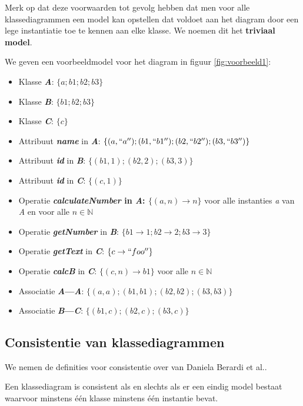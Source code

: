 Merk op dat deze voorwaarden tot gevolg hebben dat men voor alle klassediagrammen een model kan opstellen dat voldoet aan het diagram door een lege instantiatie toe te kennen aan elke klasse. We noemen dit het \textbf{triviaal model}.

We geven een voorbeeldmodel voor het diagram in figuur \ref{fig:voorbeeld1}:

\begin{itemize}
	\item Klasse \textbf{\textit{A}}: $\{a; b1; b2; b3\}$
	\item Klasse \textbf{\textit{B}}: $\{b1; b2; b3\}$
	\item Klasse \textbf{\textit{C}}: $\{c\}$
	\item Attribuut \textbf{\textit{name}} in \textbf{\textit{A}}: $\{(a,``a''); (b1,``b1''); (b2,``b2''); (b3,``b3'')\}$
	\item Attribuut \textbf{\textit{id}} in \textbf{\textit{B}}: $\{(b1,1);(b2,2);(b3,3)\}$
	\item Attribuut \textbf{\textit{id}} in \textbf{\textit{C}}: $\{(c,1)\}$
	\item Operatie \textbf{\textit{calculateNumber} in \textbf{\textit{A}}: $\{(a,n)\rightarrow{}n\}$} voor alle instanties \textit{a} van \textit{A} en voor alle $n \in \mathbb{N}$
	\item Operatie \textbf{\textit{getNumber}} in \textbf{\textit{B}}: $\{b1\rightarrow{}1; b2\rightarrow{}2; b3\rightarrow{}3\}$
	\item Operatie \textbf{\textit{getText}} in \textbf{\textit{C}}: $\{c\rightarrow{}``foo''\}$
	\item Operatie \textbf{\textit{calcB}} in \textbf{\textit{C}}: $\{(c,n)\rightarrow{}b1\}$ voor alle $n \in \mathbb{N}$
	\item Associatie \textbf{\textit{A}---\textit{A}}: $\{(a, a); (b1, b1); (b2, b2); (b3, b3)\}$
	\item Associatie \textbf{\textit{B}---\textit{C}}: $\{(b1,c); (b2,c); (b3,c)\}$
\end{itemize}

\subsection{Consistentie van klassediagrammen}

We nemen de definities voor consistentie over van Daniela Berardi et al.\cite{BerardiDaniela2005RoUc}.

\begin{definition}
Een klassediagram is consistent als en slechts als er een eindig model bestaat waarvoor minstens \'e\'en klasse minstens \'e\'en instantie bevat.
\end{definition}\label{def:diagram-consistency}

